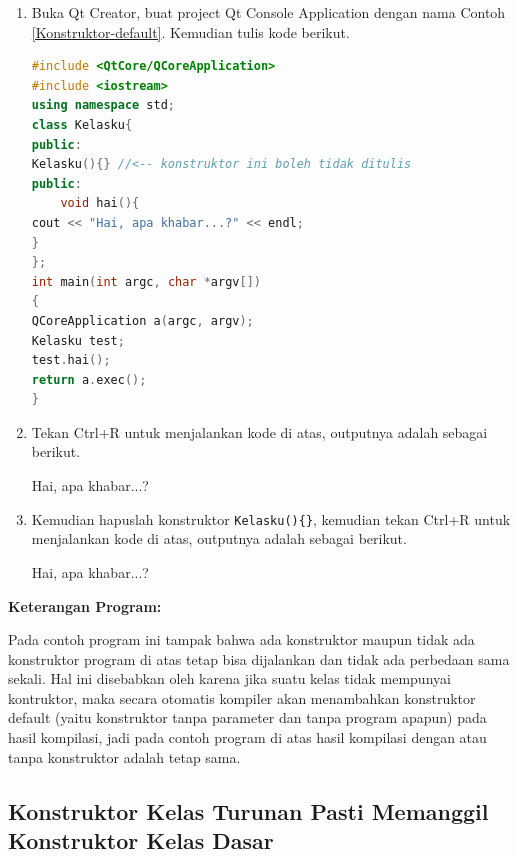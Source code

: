 \begin{enumerate}

\item
  Buka Qt Creator, buat project Qt Console Application dengan nama
  Contoh \ref{Konstruktor-default}. Kemudian tulis kode berikut.

\begin{lstlisting}[language=c++, caption=Konstruktor default, label=Konstruktor-default]
#include <QtCore/QCoreApplication>
#include <iostream>
using namespace std;
class Kelasku{
public:
Kelasku(){} //<-- konstruktor ini boleh tidak ditulis
public:
    void hai(){
cout << "Hai, apa khabar...?" << endl;
}
};
int main(int argc, char *argv[])
{
QCoreApplication a(argc, argv);
Kelasku test;
test.hai();
return a.exec();
}
\end{lstlisting}
\item
  Tekan Ctrl+R untuk menjalankan kode di atas, outputnya adalah sebagai
  berikut.

\begin{lcverbatim}
 Hai, apa khabar...?
\end{lcverbatim}



\item
  Kemudian hapuslah konstruktor \texttt{Kelasku()\{\}}, kemudian tekan
  Ctrl+R untuk menjalankan kode di atas, outputnya adalah sebagai
  berikut.
  \begin{lcverbatim}
  Hai, apa khabar...?
  \end{lcverbatim}
\end{enumerate}



\textbf{Keterangan Program:}

Pada contoh program ini tampak bahwa ada konstruktor maupun tidak ada
konstruktor program di atas tetap bisa dijalankan dan tidak ada
perbedaan sama sekali. Hal ini disebabkan oleh karena jika suatu kelas
tidak mempunyai kontruktor, maka secara otomatis kompiler akan
menambahkan konstruktor default (yaitu konstruktor tanpa parameter dan
tanpa program apapun) pada hasil kompilasi, jadi pada contoh program di
atas hasil kompilasi dengan atau tanpa konstruktor adalah tetap sama.

\subsection{Konstruktor Kelas Turunan Pasti Memanggil Konstruktor
Kelas
Dasar}\label{konstruktor-kelas-turunan-pasti-memanggil-konstruktor-kelas-dasar}

